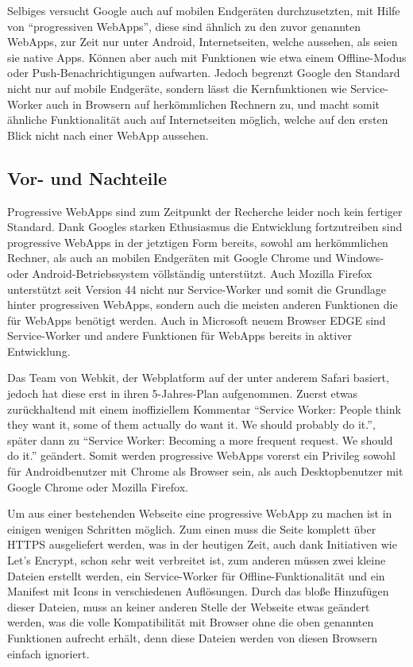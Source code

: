 \documentclass[a4paper,12pt,ngerman,listof=numbered]{scrartcl}      %
\let\oldcite\cite
\renewcommand{\cite}[1]{\textsuperscript{\oldcite{#1}}}
\begin{document}
	Selbiges versucht Google auch auf mobilen Endgeräten durchzusetzten, mit Hilfe von ``progressiven WebApps'', diese sind ähnlich zu den zuvor genannten WebApps, zur Zeit nur unter Android, Internetseiten, welche aussehen, als seien sie native Apps. Können aber auch mit Funktionen wie etwa einem Offline-Modus oder Push-Be\-nach\-rich\-ti\-gungen aufwarten. Jedoch begrenzt Google den Standard nicht nur auf mobile Endgeräte, sondern lässt die Kernfunktionen wie Service-Worker auch in Browsern auf herkömmlichen Rechnern zu, und macht somit ähnliche Funktionalität auch auf Internetseiten möglich, welche auf den ersten Blick nicht nach einer WebApp aussehen.\cite{prwebappWiki}\par
	
	\subsection{Vor- und Nachteile}
	Progressive WebApps sind zum Zeitpunkt der Recherche leider noch kein fertiger Standard. Dank Googles starken Ethusiasmus die Entwicklung fortzutreiben sind progressive WebApps in der jetztigen Form bereits, sowohl am herkömmlichen Rechner, als auch an mobilen Endgeräten mit Google Chrome und Windows- oder Android-Betriebssystem völlständig unterstützt. Auch Mozilla Firefox unterstützt seit Version 44 nicht nur Service-Worker und somit die Grundlage hinter progressiven WebApps, sondern auch die meisten anderen Funktionen die für WebApps benötigt werden.\cite{swReady} Auch in Microsoft neuem Browser EDGE sind Service-Worker und andere Funktionen für WebApps bereits in aktiver Entwicklung.\par
	Das Team von Webkit, der Webplatform auf der unter anderem Safari basiert, jedoch hat diese erst in ihren 5-Jahres-Plan aufgenommen. Zuerst etwas zurückhaltend mit einem inoffiziellem Kommentar ``Service Worker: People think they want it, some of them actually do want it. We should probably do it.''\cite{webkitServiceWorkerTwitter}, später dann zu ``Service Worker: Becoming a more frequent request. We should do it.''\cite{webkitServiceWorker5yPlan} geändert. Somit werden progressive WebApps vorerst ein Privileg sowohl für Androidbenutzer mit Chrome als Browser sein, als auch Desktopbenutzer mit Google Chrome oder Mozilla Firefox. \cite{telerikWebApp}\par
	Um aus einer bestehenden Webseite eine progressive WebApp zu machen ist in einigen wenigen Schritten möglich. Zum einen muss die Seite komplett über HTTPS ausgeliefert werden, was in der heutigen Zeit, auch dank Initiativen wie Let's Encrypt, schon sehr weit verbreitet ist, zum anderen müssen zwei kleine Dateien erstellt werden, ein Service-Worker für Offline-Funktionalität und ein Manifest mit Icons in verschiedenen Auflösungen. Durch das bloße Hinzufügen dieser Dateien, muss an keiner anderen Stelle der Webseite etwas geändert werden, was die volle Kompatibilität mit Browser ohne die oben genannten Funktionen aufrecht erhält, denn diese Dateien werden von diesen Browsern einfach ignoriert.\par
\end{document}

